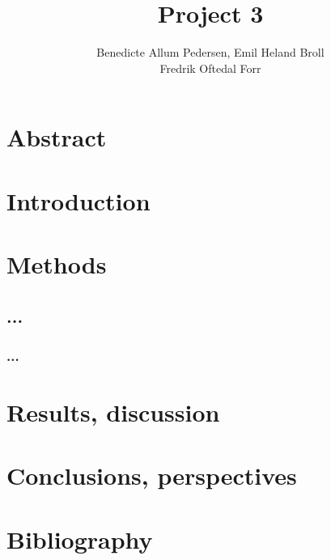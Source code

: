 \documentclass{article}
\title{Project 3}\vspace{-3ex}
\author{Benedicte Allum Pedersen, Emil Heland Broll\\ Fredrik Oftedal Forr}
\date{\vspace{-5ex}}
\begin{document}
\maketitle

\section{Abstract}


\section{Introduction}



\section{Methods}
	\subsection{...}


		\subsubsection{...}

\section{Results, discussion}


\section{Conclusions, perspectives}



\section{Bibliography}
\end{document}
